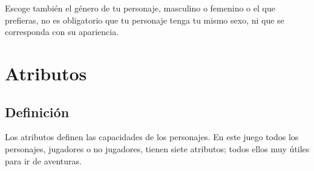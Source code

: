 Escoge también el género de tu personaje, masculino o femenino o el que prefieras, no es obligatorio que tu personaje tenga tu mismo sexo, ni que se corresponda con su apariencia.

\section{Atributos}

\subsection{Definición}

Los atributos definen las capacidades de los personajes. En este juego todos los personajes, jugadores o no jugadores, tienen siete atributos; todos ellos muy útiles para ir de aventuras.

